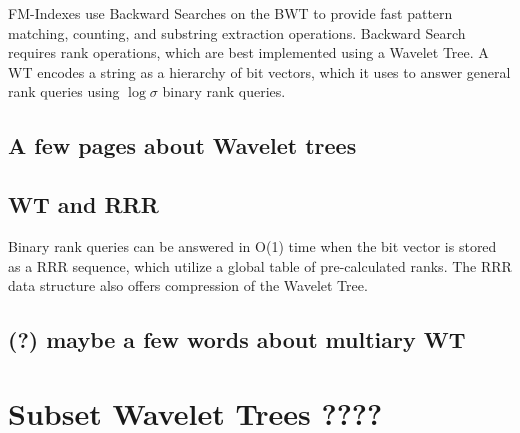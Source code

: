 FM-Indexes use Backward Searches on the BWT to provide fast pattern matching, counting, and substring extraction
operations. Backward Search requires rank operations, which are best implemented using a Wavelet Tree. A WT encodes a string as a hierarchy of bit vectors, which it uses to answer general rank queries using $\log \sigma$ binary rank queries.

\subsection{A few pages about Wavelet trees}

\lipsum[9-10]

\subsection{WT and RRR}

Binary rank queries can be answered in O(1) time when the bit vector is stored as a RRR sequence, which utilize a global table of pre-calculated ranks. The RRR data structure also offers compression of the Wavelet Tree.

\subsection{(?) maybe a few words about multiary WT}

\lipsum[1-2]


\section{Subset Wavelet Trees ????}
